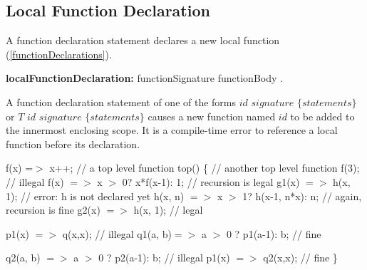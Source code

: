 \documentclass{article}
\begin{document}




\subsection{Local Function Declaration}

\LMHash{}
A function declaration statement declares a new local function (\ref{functionDeclarations}).

 \begin{grammar}
{\bf localFunctionDeclaration:}
    functionSignature functionBody
  .
 \end{grammar}

\LMHash{}
A function declaration statement of one of the forms $id$ $signature$ $\{ statements \}$ or $T$ $id$ $signature$ $\{ statements \}$ causes a new function named $id$ to be added to the innermost enclosing scope. It is a compile-time error to reference a local function before its declaration.



\begin{dartCode}
f(x) =$>$ x++;  // a top level function
top() \{ // another top level function
  f(3); // illegal
  f(x) $=>$ x $>$ 0? x*f(x-1): 1;  // recursion is legal
  g1(x) $=>$ h(x, 1); // error: h is not declared yet
  h(x, n) $=>$ x $>$ 1? h(x-1, n*x): n; // again, recursion is fine
  g2(x) $=>$ h(x, 1); // legal

  p1(x) $=>$ q(x,x); // illegal
  q1(a, b)$ =>$ a $>$ 0 ? p1(a-1): b; // fine

  q2(a, b) $=>$ a $>$ 0 ? p2(a-1): b; // illegal
  p1(x) $=>$ q2(x,x); // fine
\}
\end{dartCode}
\end{document}
